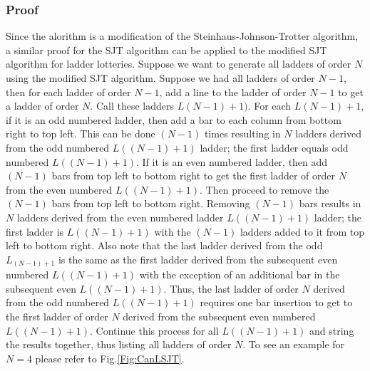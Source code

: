 \subsubsection{Proof} 
Since the alorithm is a modification of the Steinhaus-Johnson-Trotter algorithm, a similar proof for the SJT algorithm 
can be applied to the modified SJT algorithm for ladder lotteries. Suppose we want to generate all ladders 
of order $N$ using the modified SJT algorithm. Suppose we had all ladders of order $N-1$, then for 
each ladder of order $N-1$, add a line to the ladder of order $N-1$ to get a ladder of order $N$. Call these ladders 
$L(N-1)+1)$. For each $L(N-1)+1$, if it is an odd numbered ladder, then add a bar to each column from bottom right 
to top left. This can be done $(N-1)$ times resulting in $N$ ladders derived from the odd numbered 
$L((N-1)+1)$ ladder; the first ladder equals odd numbered $L((N-1)+1)$. 
If it is an even numbered ladder, then add $(N-1)$ bars from top left to bottom right to get the first ladder 
of order $N$ from the even numbered $L((N-1)+1)$. Then proceed to remove the $(N-1)$ bars from top left to bottom right. 
Removing $(N-1)$ bars results in $N$ ladders derived from the even numbered ladder $L((N-1)+1)$ ladder; the first ladder 
is $L((N-1)+1)$ with the $(N-1)$ ladders added to it from top left to bottom right. Also note that the last ladder derived from 
the odd $L_{(N-1)+1}$ is the same as the first ladder derived from the subsequent even numbered $L((N-1)+1)$ with the exception 
of an additional bar in the subsequent even $L((N-1)+1)$. Thus, the last ladder of order $N$ derived from 
the odd numbered $L((N-1)+1)$ requires one bar insertion to get to the first ladder of order $N$ derived from the subsequent 
even numbered $L((N-1)+1)$. Continue this process for all $L((N-1)+1)$ and string the results together, thus 
listing all ladders of order $N$. To see an example for $N=4$ please refer to Fig.\ref{Fig:CanLSJT}.\pagebreak

